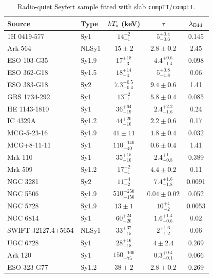 \begin{table}
\centering
\caption{Radio-quiet Seyfert sample fitted with slab \texttt{compTT}/\texttt{comptt}.}
\label{tab:comptt_sample}
\renewcommand{\arraystretch}{1.25}
\begin{tabular}{llccc}
\hline
Source & Type & $kT_{\rm e}$ (keV) & $\tau$ & $\lambda_{\rm Edd}$ \\
\hline
1H 0419-577 & Sy1 & $14^{+2}_{-1}$ & $5^{+0.4}_{-0.6}$ & 0.145 \\
Ark 564 & NLSy1 & $15 \pm 2$ & $2.8 \pm 0.2$ & 2.45 \\
ESO 103-G35 & Sy1.9 & $17^{+18}_{-3}$ & $4.4^{+0.6}_{-1.4}$ & 0.098 \\
ESO 362-G18 & Sy1.5 & $18^{+14}_{-4}$ & $5^{+0.8}_{-1.8}$ & 0.06 \\
ESO 383-G18 & Sy2 & $7.3^{+0.5}_{-0.4}$ & $9.4 \pm 0.6$ & 1.41 \\
GRS 1734-292 & Sy1 & $13^{+2}_{-1}$ & $5.8 \pm 0.4$ & 0.085 \\
HE 1143-1810 & Sy1 & $36^{+64}_{-19}$ & $2.4^{+2.2}_{-1.6}$ & 0.24 \\
IC 4329A & Sy1.2 & $44^{+20}_{-10}$ & $2.2 \pm 0.6$ & 0.17 \\
MCG-5-23-16 & Sy1.9 & $41 \pm 11$ & $1.8 \pm 0.4$ & 0.032 \\
MCG+8-11-11 & Sy1 & $110^{+140}_{-40}$ & $0.6 \pm 0.4$ & 1.41 \\
Mrk 110 & Sy1 & $35^{+15}_{-10}$ & $2.4^{+1}_{-0.8}$ & 0.389 \\
Mrk 509 & Sy1.2 & $17^{+2}_{-1}$ & $4.4 \pm 0.2$ & 0.11 \\
NGC 3281 & Sy2 & $11^{+4}_{-2}$ & $7.4^{+1.6}_{-1.8}$ & 0.0091 \\
NGC 5506 & Sy1.9 & $510^{+250}_{-150}$ & $0.04 \pm 0.02$ & 0.052 \\
NGC 5728 & Sy1.9 & $13 \pm 1$ & $10^{+4}_{-2}$ & 0.0053 \\
NGC 6814 & Sy1 & $60^{+24}_{-20}$ & $1.6^{+1.4}_{-0.6}$ & 0.02 \\
SWIFT J2127.4+5654 & NLSy1 & $33^{+37}_{-15}$ & $2^{+1.6}_{-1.2}$ & 0.06 \\
UGC 6728 & Sy1 & $28^{+16}_{-18}$ & $4 \pm 2.4$ & 0.269 \\
Ark 120 & Sy1 & $150^{+160}_{-75}$ & $0.3^{+0.4}_{-0.1}$ & 0.066 \\
ESO 323-G77 & Sy1.2 & $38 \pm 2$ & $2.8 \pm 0.2$ & 0.269 \\
\hline
\end{tabular}
\renewcommand{\arraystretch}{1.0}
\end{table}